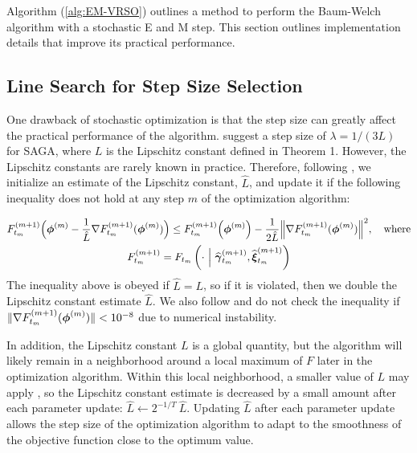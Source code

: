
Algorithm (\ref{alg:EM-VRSO}) outlines a method to perform the Baum-Welch algorithm with a stochastic E and M step. This section outlines implementation details that improve its practical performance.

\subsection{Line Search for Step Size Selection}
\label{subsec:est_L}

One drawback of stochastic optimization is that the step size can greatly affect the practical performance of the algorithm. %
\citet{Defazio:2014} suggest a step size of $\lambda = 1/(3L)$ for SAGA, where $L$ is the Lipschitz constant defined in Theorem 1. However, the Lipschitz constants are rarely known in practice. Therefore, following \citet{Schmidt:2017}, we initialize an estimate of the Lipschitz constant, $\hat L$, and update it if the following inequality does not hold at any step $m$ of the optimization algorithm:

\begin{gather}
    F^{(m+1)}_{t_m}\Big(\boldsymbol{\phi}^{(m)} - \frac{1}{\hat L} \nabla F_{t_m}^{(m+1)}(\boldsymbol{\phi}^{(m)}) \Big) \leq F^{(m+1)}_{t_m}\Big(\boldsymbol{\phi}^{(m)}\Big) - \frac{1}{2 \hat L} \Big\| \nabla F_{t_m}^{(m+1)}(\boldsymbol{\phi}^{(m)}) \Big\| ^2, \quad \text{where} \nonumber \\
    F_{t_m}^{(m+1)} = F_{t_m}\left(\cdot ~ \Big | ~ \widehat {\boldsymbol{\gamma}}^{(m+1)}_{t_m}, \widehat {\boldsymbol{\xi}}^{(m+1)}_{t_m}\right)
    \label{ineq:F}
\end{gather}
%
The inequality above is obeyed if $\hat L = L$, so if it is violated, then we double the Lipschitz constant estimate $\hat L$. We also follow \citet{Schmidt:2017} and do not check the inequality if $\| \nabla F_{t_m}^{(m+1)}(\boldsymbol{\phi}^{(m)})\| < 10^{-8}$ due to numerical instability. 

In addition, the Lipschitz constant $L$ is a global quantity, but the algorithm will likely remain in a neighborhood around a local maximum of $F$ later in the optimization algorithm. Within this local neighborhood, a smaller value of $L$ may apply \citep{Schmidt:2017}, so the Lipschitz constant estimate is decreased by a small amount after each parameter update:
%
$\hat L \leftarrow 2^{-1/T} ~ \hat L$.
%
Updating $\hat L$ after each parameter update allows the step size of the optimization algorithm to adapt to the smoothness of the objective function close to the optimum value.


